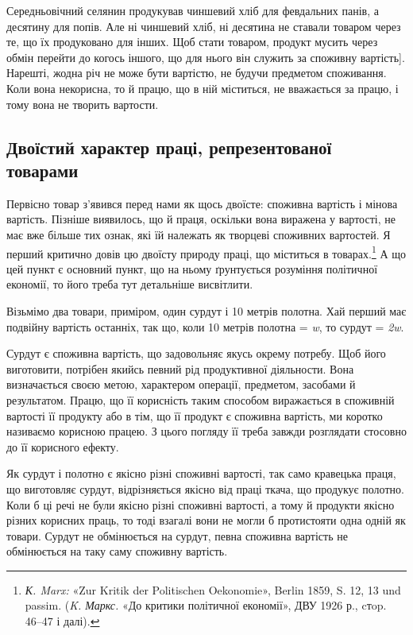 \parcont{}  %
Середньовічний селянин продукував чиншевий хліб для февдальних
панів, а десятину для попів. Але ні чиншевий хліб, ні десятина
не ставали товаром через те, що їх продуковано для інших.
Щоб стати товаром, продукт мусить через обмін перейти до когось
іншого, що для нього він служить за споживну вартість]. Нарешті,
жодна річ не може бути вартістю, не будучи предметом
споживання. Коли вона некорисна, то й працю, що в ній міститься,
не вважається за працю, і тому вона не творить вартости.

\subsection{Двоїстий характер праці, репрезентованої товарами
}

Первісно товар з’явився перед нами як щось двоїсте: споживна
вартість і мінова вартість. Пізніше виявилось, що й праця, оскільки
вона виражена у вартості, не має вже більше тих ознак,
які їй належать як творцеві споживних вартостей. Я перший
критично довів цю двоїсту природу праці, що міститься в товарах.\footnote{
\emph{К. Marx:} «Zur Kritik der Politischen Oekonomie», Berlin 1859,
S. 12, 13 und passim. (\emph{K. Маркс.} «До критики політичної економії», ДВУ
1926 р., cтop. 46--47 і далі).
} А що цей пункт є основний пункт, що на ньому ґрунтується
розуміння політичної економії, то його треба тут детальніше
висвітлити.

Візьмімо два товари, приміром, один сурдут і 10 метрів полотна.
Хай перший має подвійну вартість останніх, так що, коли
10 метрів полотна = \emph{w}, то сурдут = \emph{2w}.

Сурдут є споживна вартість, що задовольняє якусь окрему
потребу. Щоб його виготовити, потрібен якийсь певний рід продуктивної
діяльности. Вона визначається своєю метою, характером
операції, предметом, засобами й результатом. Працю, що її
корисність таким способом виражається в споживній вартості її
продукту або в тім, що її продукт є споживна вартість, ми коротко
називаємо корисною працею. З цього погляду її треба завжди
розглядати стосовно до її корисного ефекту.

Як сурдут і полотно є якісно різні споживні вартості, так само
кравецька праця, що виготовляє сурдут, відрізняється якісно
від праці ткача, що продукує полотно. Коли б ці речі не були
якісно різні споживні вартості, а тому й продукти якісно різних
корисних праць, то тоді взагалі вони не могли б протистояти одна
одній як товари. Сурдут не обмінюється на сурдут, певна споживна
вартість не обмінюється на таку саму споживну вартість.

